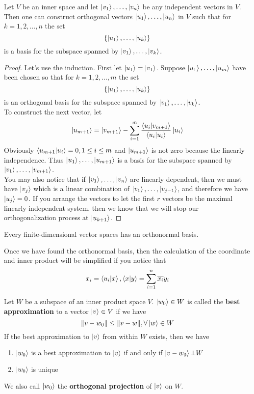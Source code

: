 \documentclass{article}
\begin{document}
\begin{thm}
	Let $V$ be an inner space and let $\ket{v_1},\dots,\ket{v_n}$ be any independent vectors in $V$. Then one can construct orthogonal vectors $\ket{u_1},\dots,\ket{u_n}$ in $V$ such that for $k=1,2,\dots,n$ the set
	\[\{\ket{u_1},\dots,\ket{u_k}\}\]
	is a basis for the subspace spanned by $\ket{v_1},\dots,\ket{v_k}$.
\end{thm}
\begin{proof}
	Let's use the induction. First let $\ket{u_1}=\ket{v_1}$. Suppose $\ket{u_1},\dots,\ket{u_m}$ have been chosen so that for $k=1,2,\dots,m$ the set
	\[\{\ket{u_1},\dots,\ket{u_k}\}\]
	is an orthogonal basis for the subspace spanned by $\ket{v_1},\dots,\ket{v_k}$.\\
	To construct the next vector, let
	\[\ket{u_{m+1}}=\ket{v_{m+1}}-\sum_{i=1}^m\frac{\braket{u_i|v_{m+1}}}{\braket{u_i|u_i}}\ket{u_i}\]
	Obviously $\braket{u_{m+1}|u_i}=0,1\le i\le m$ and $\ket{u_{m+1}}$ is not zero because the linearly independence. Thus $\ket{u_1},\dots,\ket{u_{m+1}}$ is a basis for the subspace spanned by $\ket{v_1},\dots,\ket{v_{m+1}}$.\\
	You may also notice that if $\ket{v_1},\dots,\ket{v_n}$ are linearly dependent, then we must have $\ket{v_j}$ which is a linear combination of $\ket{v_1},\dots,\ket{v_{j-1}}$, and therefore we have $\ket{u_j}=0$. If you arrange the vectors to let the first $r$ vectors be the maximal linearly independent system, then we know that we will stop our orthogonalization process at $\ket{u_{k+1}}$. 
\end{proof}
\begin{coro}
	Every finite-dimensional vector spaces has an orthonormal basis.
\end{coro}
Once we have found the orthonormal basis, then the calculation of the coordinate and inner product will be simplified if you notice that
\[x_i=\braket{u_i|x},\braket{x|y}=\sum_{i=1}^n\overline{x_i}y_i\]
\begin{lem}
	Let $W$ be a subspace of an inner product space $V$. $\ket{w_0}\in W$ is called the \textbf{best approximation} to a vector $\ket{v}\in V$ if we have
	\[\Vert v-w_0\Vert\le\Vert v-w\Vert,\forall \ket{w}\in W\]
	If the best approximation to $\ket{v}$ from within $W$ exists, then we have
	\begin{enumerate}
		\item $\ket{w_0}$ is a best approximation to $\ket{v}$ if and only if $\ket{v-w_0}\bot W$
		\item $\ket{w_0}$ is unique
	\end{enumerate}
	We also call $\ket{w_0}$ the \textbf{orthogonal projection} of $\ket{v}$ on $W$.
\end{lem}
\end{document}
